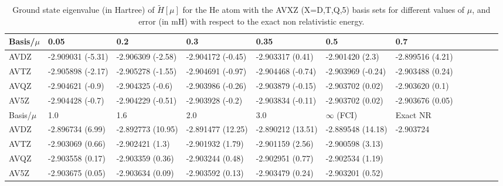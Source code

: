 \documentclass[aip,jcp,reprint,noshowkeys,superscriptaddress]{revtex4-1}
\begin{document}
\begin{table}
\label{table_conv_e_mu}
\caption{Ground state eigenvalue (in Hartree) of $\tilde{H}[\mu]$ for the He atom with the AVXZ (X=D,T,Q,5) basis sets for different values of $\mu$, and error (in mH) with respect to the exact non relativistic energy.}
\begin{ruledtabular}
\begin{tabular}{llllllllllll}
 Basis/$\mu$&0.05                 & 0.2                   & 0.3                   & 0.35                  & 0.5                  & 0.7                   \\
\hline
 AVDZ       &  -2.909031 (-5.31)  &    -2.906309 (-2.58)  &    -2.904172 (-0.45)  &    -2.903317 (0.41)   &    -2.901420 (2.3)   &    -2.899516 (4.21)   \\
 AVTZ       &  -2.905898 (-2.17)  &    -2.905278 (-1.55)  &    -2.904691 (-0.97)  &    -2.904468 (-0.74)  &    -2.903969 (-0.24) &    -2.903488 (0.24)   \\
 AVQZ       &  -2.904621 (-0.9)   &    -2.904325 (-0.6)   &    -2.903986 (-0.26)  &    -2.903879 (-0.15)  &    -2.903702 (0.02)  &    -2.903620 (0.1)     \\
 AV5Z       &  -2.904428 (-0.7)   &    -2.904229 (-0.51)  &    -2.903928 (-0.2)   &    -2.903834 (-0.11)  &    -2.903702 (0.02)  &    -2.903676 (0.05)   \\
\hline
 Basis/$\mu$ & 1.0                  & 1.6                  & 2.0                  & 3.0                  & $\infty$ (FCI)        & Exact NR              \\
\hline
 AVDZ        &    -2.896734 (6.99)  &    -2.892773 (10.95) &    -2.891477 (12.25) &    -2.890212 (13.51) &    -2.889548 (14.18)  & -2.903724             \\
 AVTZ        &    -2.903069 (0.66)  &    -2.902421 (1.3)   &    -2.901932 (1.79)  &    -2.901159 (2.56)  &    -2.900598 (3.13)   &                       \\
 AVQZ        &    -2.903558 (0.17)  &    -2.903359 (0.36)  &    -2.903244 (0.48)  &    -2.902951 (0.77)  &    -2.902534 (1.19)   &                       \\
 AV5Z        &    -2.903675 (0.05)  &    -2.903634 (0.09)  &    -2.903592 (0.13)  &    -2.903479 (0.24)  &    -2.903201 (0.52)   &                       \\
\end{tabular}
\end{ruledtabular}
\end{table}
\end{document}
